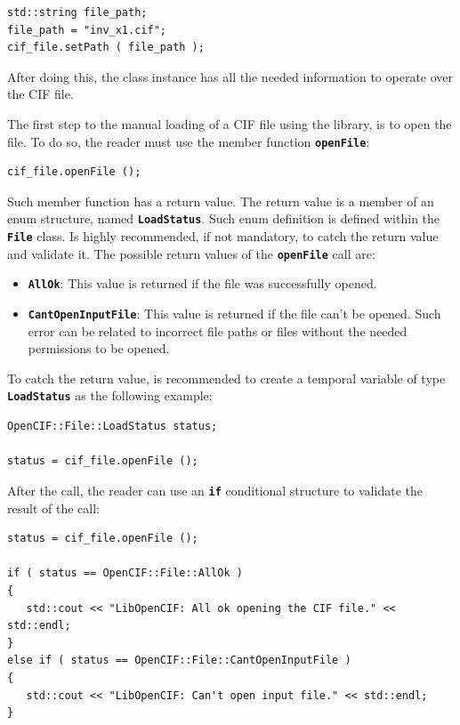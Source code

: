 \documentclass[11pt,twoside,openany,x11names,svgnames]{memoir}
\begin{document}
\begin{lstlisting}[frame=single,style=CPPStyle]
std::string file_path;
file_path = "inv_x1.cif";
cif_file.setPath ( file_path );
\end{lstlisting}

After doing this, the class instance has all the needed information to operate over the CIF file.

The first step to the manual loading of a CIF file using the library, is to open the file. To do so, the reader must use the member function \textbf{\texttt{openFile}}:

\begin{lstlisting}[frame=single,style=CPPStyle]
cif_file.openFile ();
\end{lstlisting}

Such member function has a return value. The return value is a member of an enum structure, named \textbf{\texttt{LoadStatus}}. Such enum definition is defined within the \textbf{\texttt{File}} class. Is highly recommended, if not mandatory, to catch the return value and validate it. The possible return values of the \textbf{\texttt{openFile}} call are:

\begin{itemize}
	\item \textbf{\texttt{AllOk}}: This value is returned if the file was successfully opened.
	
	\item \textbf{\texttt{CantOpenInputFile}}: This value is returned if the file can't be opened. Such error can be related to incorrect file paths or files without the needed permissions to be opened.
\end{itemize}

To catch the return value, is recommended to create a temporal variable of type \textbf{\texttt{LoadStatus}} as the following example:

\begin{lstlisting}[frame=single,style=CPPStyle]
OpenCIF::File::LoadStatus status;

status = cif_file.openFile ();
\end{lstlisting}

After the call, the reader can use an \textbf{\texttt{if}} conditional structure to validate the result of the call:

\begin{lstlisting}[frame=single,style=CPPStyle]
status = cif_file.openFile ();
   
if ( status == OpenCIF::File::AllOk )
{
   std::cout << "LibOpenCIF: All ok opening the CIF file." << std::endl;
}
else if ( status == OpenCIF::File::CantOpenInputFile )
{
   std::cout << "LibOpenCIF: Can't open input file." << std::endl;
}
\end{lstlisting}
\end{document}
